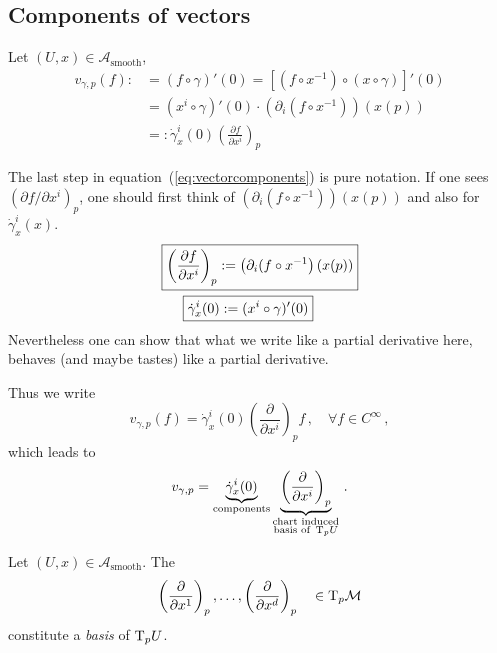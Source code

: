 \documentclass[11pt, a4paper, twocolumn]{article} %
\begin{document}
\subsection{Components of vectors}
Let $(U,x) \in \mathcal{A}_\text{smooth}$,
\begin{align}
    v_{\gamma,p}(f):&= (f\circ\gamma)'(0) = \left[ (f\circ x^{-1})\circ(x\circ\gamma) \right]'(0) \nonumber\\
    &= (x^i\circ\gamma)' (0) \cdot \left( \partial_i (f\circ x^{-1}) \right)\left( x(p) \right)\nonumber\\
    &=:\dot{\gamma}^i_x(0) \left(\frac{\partial f}{\partial x^i}\right)_p
    \label{eq:vectorcomponents}
\end{align}
\begin{note}
    The last step in equation~(\ref{eq:vectorcomponents}) is pure notation.
    If one sees $(\partial f / \partial x^i)_p$, one should first think of
    $\left( \partial_i (f\circ x^{-1}) \right)\left( x(p) \right)$ and also
    for $\dot{\gamma}^i_x(x)$.
    \begin{align}
        \Aboxed{%
            \left( \frac{\partial f}{\partial x^i} \right)_p &:= \left( \partial_i(f\circ x^{-1} \right)(x(p))}\\
        \Aboxed{%
        \dot{\gamma}_x^i (0) &:= (x^i\circ\gamma)'(0)}
    \end{align}
    Nevertheless one can show that what we write like a partial derivative here,
    behaves (and maybe tastes) like a partial derivative.
\end{note}
Thus we write
\begin{equation}
    v_{\gamma,p}(f) = \dot{\gamma}^i_x(0)\left( \frac{\partial}{\partial x^i} \right)_p f\,,\quad\forall f\in C^\infty\,,
\end{equation}
which leads to
\begin{equation}
    v_{\gamma,p} = \underbrace{\dot{\gamma}^i_x(0)}_{\text{components}} 
\underbrace{\left( \frac{\partial}{\partial x^i} \right)_p}_{\substack{\text{chart induced} \\\text{basis of } \T_pU}}\,.
\end{equation}
\begin{theorem}
    Let $(U,x) \in \mathcal{A}_\text{smooth}$.
    The
    \begin{equation}
        \left( \frac{\partial}{\partial x^1} \right)_p, \ldots, \left( \frac{\partial}{\partial x^d} \right)_p \quad \in \T_p\M
    \end{equation}
    constitute a \textit{basis} of $\T_pU$.
\end{theorem}
\end{document}
